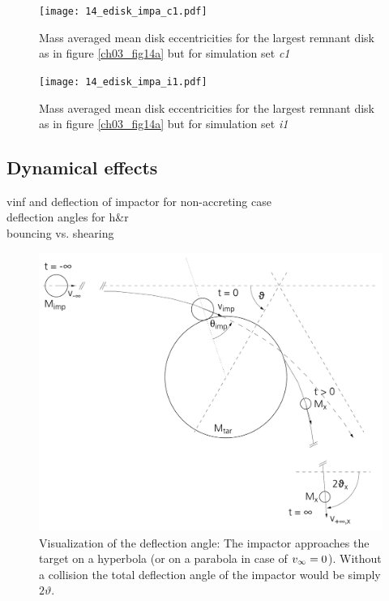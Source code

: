 \begin{landscape}
\begin{figure}
\begin{center}
\texttt{[image: 14\_edisk\_impa\_c1.pdf]}
\caption{Mass averaged mean disk eccentricities for the largest remnant disk as in figure \ref{ch03_fig14a} but for simulation set \emph{c1}}
\label{ch03_fig14b}
\end{center}
\end{figure}

\begin{figure}
\begin{center}
\texttt{[image: 14\_edisk\_impa\_i1.pdf]}
\caption{Mass averaged mean disk eccentricities for the largest remnant disk as in figure \ref{ch03_fig14a} but for simulation set \emph{i1}}
\label{ch03_fig14c}
\end{center}
\end{figure}
\end{landscape}


\subsection{Dynamical effects}
vinf and deflection of impactor for non-accreting case\\
deflection angles for h\&r \\
bouncing vs. shearing \\

\begin{figure}[htbp]
\begin{center}
\includegraphics[scale=0.5]{04_vartheta}
\caption{Visualization of the deflection angle: The impactor approaches the target on a hyperbola (or on a parabola in case of $v_{\infty} = 0$). Without a collision the total deflection angle of the impactor would be simply $2 \vartheta$.}
\label{ch03_fig02}
\end{center}
\end{figure}


